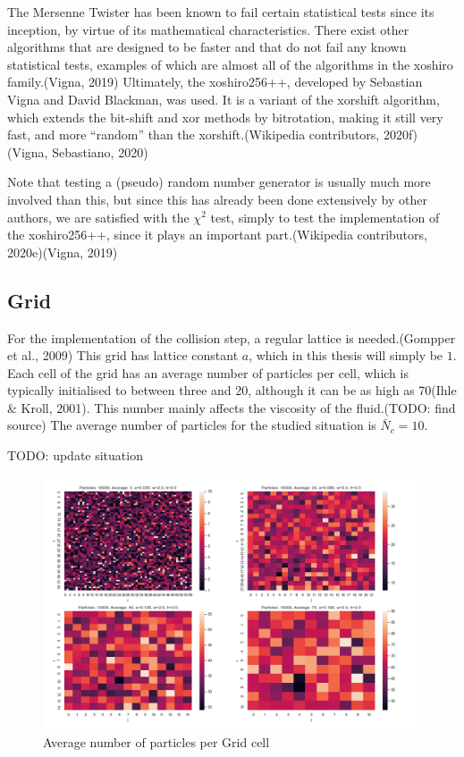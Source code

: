 \documentclass[
]{article}
\begin{document}
The Mersenne Twister has been known to fail certain statistical tests
since its inception, by virtue of its mathematical characteristics.
There exist other algorithms that are designed to be faster and that do
not fail any known statistical tests, examples of which are almost all
of the algorithms in the xoshiro family.(Vigna, 2019) Ultimately, the
xoshiro256++, developed by Sebastian Vigna and David Blackman, was used.
It is a variant of the xorshift algorithm, which extends the bit-shift
and xor methods by bitrotation, making it still very fast, and more
``random'' than the xorshift.(Wikipedia contributors, 2020f)(Vigna,
Sebastiano, 2020)

Note that testing a (pseudo) random number generator is usually much
more involved than this, but since this has already been done
extensively by other authors, we are satisfied with the \(\chi^2\) test,
simply to test the implementation of the xoshiro256++, since it plays an
important part.(Wikipedia contributors, 2020e)(Vigna, 2019)

\hypertarget{grid}{%
\subsection{Grid}\label{grid}}

For the implementation of the collision step, a regular lattice is
needed.(Gompper et al., 2009) This grid has lattice constant \(a\),
which in this thesis will simply be \(1\). Each cell of the grid has an
average number of particles per cell, which is typically initialised to
between three and 20, although it can be as high as 70(Ihle \& Kroll,
2001). This number mainly affects the viscosity of the fluid.(TODO: find
source) The average number of particles for the studied situation is
\(\bar N_c = 10\).

TODO: update situation

\begin{figure}
\centering
\includegraphics{Assets/average_grid_particles.png}
\caption{Average number of particles per Grid cell}
\end{figure}
\end{document}
